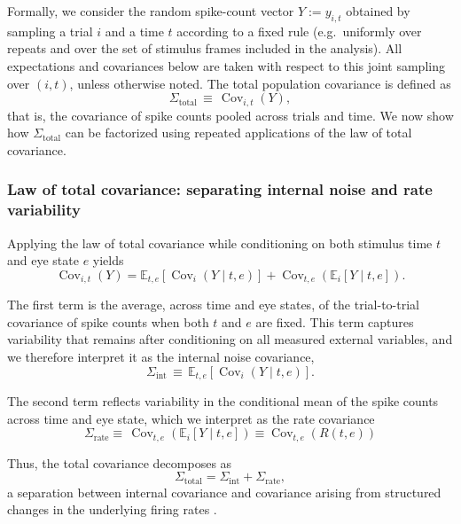 \documentclass{lite}
\newcommand{\E}{\mathbb{E}}
\newcommand{\C}{\operatorname{Cov}}
\newcommand{\Crate}{\Sigma_{\text{rate}}}
\begin{document}
Formally, we consider the random spike-count vector $Y := y_{i,t}$ obtained by sampling a trial $i$ and a time $t$ according to a fixed rule (e.g.\ uniformly over repeats and over the set of stimulus frames included in the analysis). All expectations and covariances below are taken with respect to this joint sampling over $(i,t)$, unless otherwise noted. The total population covariance is defined as
\begin{equation}
\Sigma_{\text{total}} \,\equiv\, \C_{i,t}(Y),
\end{equation}
that is, the covariance of spike counts pooled across trials and time.
We now show how $\Sigma_{\text{total}}$ can be factorized using repeated applications of the law of total covariance.

\subsubsection{Law of total covariance: separating internal noise and rate variability}

Applying the law of total covariance while conditioning on both stimulus time $t$ and eye state $e$ yields
\begin{equation}
\C_{i,t}(Y)
= \E_{t,e}\!\left[ \C_{i}(Y \mid t,e) \right]
+ \C_{t,e}\!\left( \E_{i}[Y \mid t,e] \right).
\end{equation}

The first term is the average, across time and eye states, of the trial-to-trial covariance of spike counts when both $t$ and $e$ are fixed. This term captures variability that remains after conditioning on all measured external variables, and we therefore interpret it as the internal noise covariance,
\begin{equation}
\Sigma_{\text{int}} \,\equiv\, \E_{t,e}\!\left[ \C_{i}(Y \mid t,e) \right].
\end{equation}

The second term reflects variability in the conditional mean of the spike counts across time and eye state, which we interpret as the rate covariance
\begin{equation}
\Crate \equiv\, \C_{t,e}(\E_{i}[Y \mid t,e]) \equiv \C_{t,e}(R(t,e))
\end{equation}

Thus, the total covariance decomposes as
\begin{equation}
\label{eq:law1}
\Sigma_{\text{total}} = \Sigma_{\text{int}} + \Sigma_{\text{rate}},
\end{equation}
a separation between internal covariance and covariance arising from structured changes in the underlying firing rates \cite{churchland2011variance}.
\end{document}
